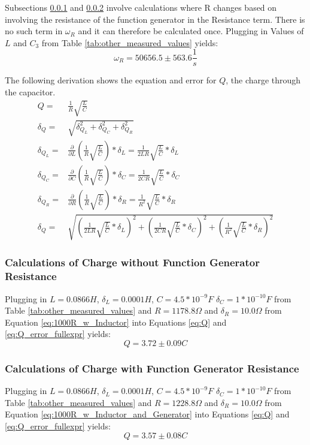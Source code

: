 \documentclass[12pt]{article}
\newcommand{\paren}[1]{\left( {#1} \right)}
\begin{document}
Subsections \ref{subsub:nofunc} and \ref{subsub:func} involve calculations where R changes based on involving the resistance of the function generator in the Resistance term. There is no such term in $\omega_R$ and it can therefore be calculated once. Plugging in Values of $L$ and $C_3$ from Table \ref{tab:other_measured_values} yields:
\begin{equation}
	\omega_R=50656.5\pm563.6\frac{1}{s} \label{num:omega_R}
\end{equation}

The following derivation shows the equation and error for $Q$, the charge through the capacitor.
\begin{align}
	Q=&\frac{1}{R}\sqrt{\frac{L}{C}} \label{eq:Q} \\
	\delta_{Q}=&\sqrt{\delta_{Q_L}^2+\delta_{Q_C}^2+\delta_{Q_R}^2} \label{eq:Q_error} \\
	\delta_{Q_L}=&\frac{\partial}{\partial L}\paren{\frac{1}{R}\sqrt{\frac{L}{C}}}*\delta_L=\frac{1}{2LR}\sqrt{\frac{L}{C}}*\delta_L \nonumber \\
	\delta_{Q_C}=&\frac{\partial}{\partial C}\paren{\frac{1}{R}\sqrt{\frac{L}{C}}}*\delta_C=\frac{1}{2CR}\sqrt{\frac{L}{C}}*\delta_C \nonumber \\
	\delta_{Q_R}=&\frac{\partial}{\partial R}\paren{\frac{1}{R}\sqrt{\frac{L}{C}}}*\delta_R=\frac{1}{R^2}\sqrt{\frac{L}{C}}*\delta_R \nonumber \\
	\delta_{Q}=&\sqrt{\paren{\frac{1}{2LR}\sqrt{\frac{L}{C}}*\delta_L}^2+\paren{\frac{1}{2CR}\sqrt{\frac{L}{C}}*\delta_C}^2+\paren{\frac{1}{R^2}\sqrt{\frac{L}{C}}*\delta_R}^2} \label{eq:Q_error_fullexpr}
\end{align}

\subsubsection{Calculations of Charge without Function Generator Resistance} \label{subsub:nofunc}
Plugging in $L=0.0866H$, $\delta_L=0.0001H$, $C=4.5*10^{-9}F$ $\delta_C=1*10^{-10}F$ from Table \ref{tab:other_measured_values} and $R=1178.8\Omega$ and $\delta_R=10.0\Omega$ from Equation \ref{eq:1000R_w_Inductor} into Equations \ref{eq:Q} and \ref{eq:Q_error_fullexpr} yields:
\begin{equation}
	Q=3.72\pm0.09C \label{num:Q_nofunc}
\end{equation}

\subsubsection{Calculations of Charge with Function Generator Resistance} \label{subsub:func}
Plugging in $L=0.0866H$, $\delta_L=0.0001H$, $C=4.5*10^{-9}F$ $\delta_C=1*10^{-10}F$ from Table \ref{tab:other_measured_values} and $R=1228.8\Omega$ and $\delta_R=10.0\Omega$ from Equation \ref{eq:1000R_w_Inductor_and_Generator} into Equations \ref{eq:Q} and \ref{eq:Q_error_fullexpr} yields:
\begin{equation}
	Q=3.57\pm0.08C \label{num:Q_func}
\end{equation}
\end{document}
